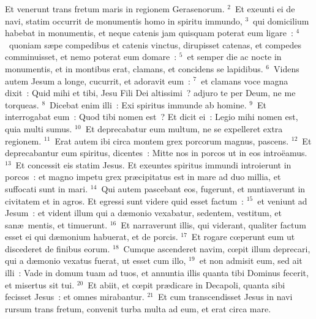 \lettrine[lines=3,image=true,loversize=0.05,lraise=-0.03]{E}{}t venerunt trans fretum maris in regionem Gerasenorum.
${}^{2}$~Et exeunti ei de navi, statim occurrit de monumentis homo in spiritu immundo,
${}^{3}$~qui domicilium habebat in monumentis, et neque catenis jam quisquam poterat eum ligare~:
${}^{4}$~quoniam s\ae pe compedibus et catenis vinctus, dirupisset catenas, et compedes comminuisset, et nemo poterat eum domare~:
${}^{5}$~et semper die ac nocte in monumentis, et in montibus erat, clamans, et concidens se lapidibus.
${}^{6}$~Videns autem Jesum a longe, cucurrit, et adoravit eum~:
${}^{7}$~et clamans voce magna dixit~: Quid mihi et tibi, Jesu Fili Dei altissimi~? adjuro te per Deum, ne me torqueas.
${}^{8}$~Dicebat enim illi~: Exi spiritus immunde ab homine.
${}^{9}$~Et interrogabat eum~: Quod tibi nomen est~? Et dicit ei~: Legio mihi nomen est, quia multi sumus.
${}^{10}$~Et deprecabatur eum multum, ne se expelleret extra regionem.
${}^{11}$~Erat autem ibi circa montem grex porcorum magnus, pascens.
${}^{12}$~Et deprecabantur eum spiritus, dicentes~: Mitte nos in porcos ut in eos intro\"eamus.
${}^{13}$~Et concessit eis statim Jesus. Et exeuntes spiritus immundi introierunt in porcos~: et magno impetu grex pr\ae cipitatus est in mare ad duo millia, et suffocati sunt in mari.
${}^{14}$~Qui autem pascebant eos, fugerunt, et nuntiaverunt in civitatem et in agros. Et egressi sunt videre quid esset factum~:
${}^{15}$~et veniunt ad Jesum~: et vident illum qui a d\ae monio vexabatur, sedentem, vestitum, et san\ae\ mentis, et timuerunt.
${}^{16}$~Et narraverunt illis, qui viderant, qualiter factum esset ei qui d\ae monium habuerat, et de porcis.
${}^{17}$~Et rogare cœperunt eum ut discederet de finibus eorum.
${}^{18}$~Cumque ascenderet navim, cœpit illum deprecari, qui a d\ae monio vexatus fuerat, ut esset cum illo,
${}^{19}$~et non admisit eum, sed ait illi~: Vade in domum tuam ad tuos, et annuntia illis quanta tibi Dominus fecerit, et misertus sit tui.
${}^{20}$~Et abiit, et cœpit pr\ae dicare in Decapoli, quanta sibi fecisset Jesus~: et omnes mirabantur.
${}^{21}$~Et cum transcendisset Jesus in navi rursum trans fretum, convenit turba multa ad eum, et erat circa mare.


